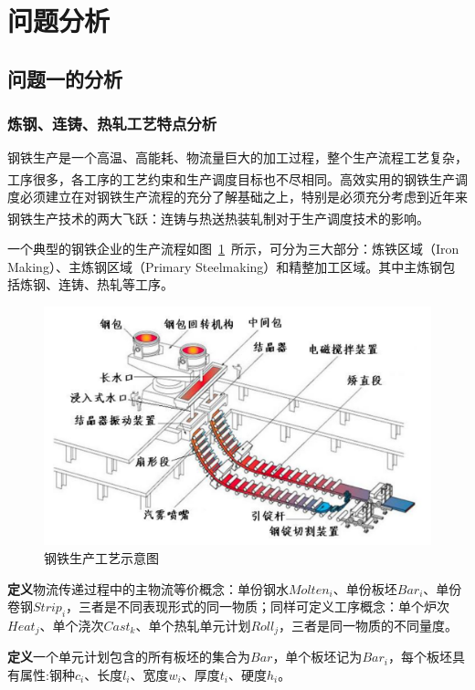 \documentclass{whutmod}
\newcommand{\upcite}[1]{\textsuperscript{\cite{#1}}}
\begin{document}
\section{问题分析}
\subsection{问题一的分析}
\subsubsection{炼钢、连铸、热轧工艺特点分析}
钢铁生产是一个高温、高能耗、物流量巨大的加工过程，整个生产流程工艺复杂，工序很多，各工序的工艺约束和生产调度目标也不尽相同\upcite{1,2}。高效实用的钢铁生产调度必须建立在对钢铁生产流程的充分了解基础之上，特别是必须充分考虑到近年来钢铁生产技术的两大飞跃：连铸与热送热装轧制对于生产调度技术的影响\upcite{1,3,4}。

一个典型的钢铁企业的生产流程如图~\ref{1111ss11}~所示，可分为三大部分：炼铁区域（Iron Making）、主炼钢区域（Primary Steelmaking）和精整加工区域。其中主炼钢包括炼钢、连铸、热轧等工序。
\begin{figure}[H]
\centering
\includegraphics[width=.9\textwidth]{figures/sda.png}
\caption{钢铁生产工艺示意图}\label{1111ss11}
\end{figure}

\textbf{定义}物流传递过程中的主物流等价概念：单份钢水$Molten_i$、单份板坯$Bar_i$、单份卷钢$Strip_i$，三者是不同表现形式的同一物质；同样可定义工序概念：单个炉次$Heat_j$、单个浇次$Cast_k$、单个热轧单元计划$Roll_j$，三者是同一物质的不同量度。
\vspace{7pt}	%

\textbf{定义}一个单元计划包含的所有板坯的集合为$Bar$，单个板坯记为$Bar_i$，每个板坯具有属性:钢种$c_i$、长度$l_i$、宽度$w_i$、厚度$t_i$、硬度$h_i$。
\vspace{7pt}	%
\end{document}
